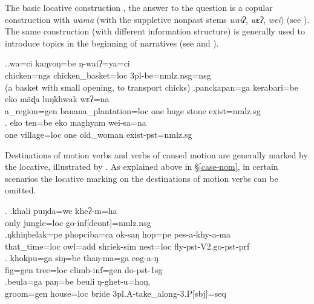 The basic locative construction \cite[15]{Levinsonetal2006_Grammars}, the answer to the question  is a copular construction with \emph{wama} (with the suppletive nonpast stems \emph{waiʔ}, \emph{wɛʔ}, \emph{wei})  (see \Next[a]). The same construction (with different information structure) is generally used to introduce topics in the beginning of narratives (see \Next[b] and \Next[c]).


\ex.\ag.wa=ci kaŋyoŋ=be ŋ-waiʔ=ya=ci\\
chicken{\sc =ngs} chicken\_basket{\sc =loc} {\sc 3pl-}be{\sc [npst]=nmlz.nsg=nsg}\\
 (a basket with small opening, to transport chicks)
\bg.panckapan=ga    kerabari=be        eko mãɖa luŋkhwak wɛʔ=na\\
a\_region{\sc =gen} banana\_plantation{\sc =loc} one huge stone exist{\sc [3sg;npst]=nmlz.sg}\\
  
\bg. eko ten=be        eko maghyam  wei-sa=na \\
one village{\sc =loc} one old\_woman exist{\sc [3sg;npst]-pst=nmlz.sg}\\
 
	
Destinations of motion verbs and verbs of caused motion are generally marked by the locative, illustrated by \Next. As explained above in §\ref{case-nom}, in certain scenarios the locative marking on the destinations of motion verbs can be omitted. 

	 \ex. \ag.khali puŋda=we  kheʔ-m=ha\\
	only jungle{\sc =loc} go-{\sc inf[deont]=nmlz.nsg}		\\
	  
\bg.ŋkhiŋbelak=pe   phopciba=ca        ok-saŋ          hop=pe     pes-a-khy-a-ma\\
that\_time{\sc =loc} owl{\sc =add} shriek{\sc -sim} nest{\sc =loc} fly{\sc [3sg]-pst-V2.go-pst-prf}\\
	 
	\bg. khokpu=ga      siŋ=be    thaŋ-ma=ga       cog-a-ŋ\\
fig{\sc =gen} tree{\sc =loc} climb{\sc -inf=gen} do{\sc -pst-1sg}\\
	 
	\bg.beula=ga    paŋ=be     beuli ŋ-ghet-u=hoŋ, \\
	groom{\sc =gen} house{\sc =loc} bride {\sc 3pl.A-}take\_along{\sc -3.P[sbj]=seq}\\


